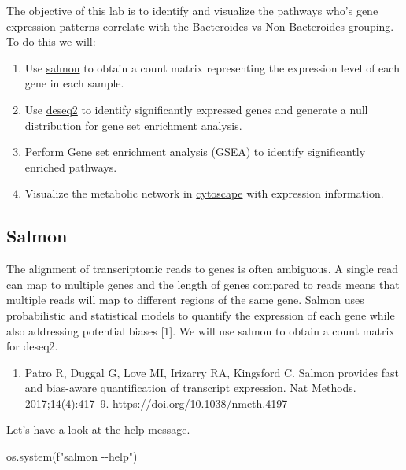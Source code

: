 \documentclass[
]{book}
\newenvironment{Shaded}{\begin{snugshade}}{\end{snugshade}}
\newcommand{\NormalTok}[1]{#1}
\newcommand{\SpecialStringTok}[1]{\textcolor[rgb]{0.31,0.60,0.02}{#1}}
\providecommand{\tightlist}{%
  \setlength{\itemsep}{0pt}\setlength{\parskip}{0pt}}
\begin{document}
The objective of this lab is to identify and visualize the pathways who's gene expression patterns correlate with the Bacteroides vs Non-Bacteroides grouping.
To do this we will:

\begin{enumerate}
\def\labelenumi{\arabic{enumi}.}
\tightlist
\item
  Use \hyperref[salmon]{salmon} to obtain a count matrix representing the expression level of each gene in each sample.
\item
  Use \hyperref[deseq2]{deseq2} to identify significantly expressed genes and generate a null distribution for gene set enrichment analysis.
\item
  Perform \hyperref[gene-set-enrichment-analysis-gsea]{Gene set enrichment analysis (GSEA)} to identify significantly enriched pathways.
\item
  Visualize the metabolic network in \hyperref[cytoscape]{cytoscape} with expression information.
\end{enumerate}

\subsection{Salmon}\label{salmon}

The alignment of transcriptomic reads to genes is often ambiguous. A single read can map to multiple genes and the length of genes compared to reads
means that multiple reads will map to different regions of the same gene. Salmon uses probabilistic and statistical models to quantify the expression of
each gene while also addressing potential biases {[}1{]}. We will use salmon to obtain a count matrix for deseq2.

\begin{enumerate}
\def\labelenumi{\arabic{enumi}.}
\tightlist
\item
  Patro R, Duggal G, Love MI, Irizarry RA, Kingsford C. Salmon provides fast and bias-aware quantification of transcript expression. Nat Methods. 2017;14(4):417--9. \url{https://doi.org/10.1038/nmeth.4197}
\end{enumerate}

Let's have a look at the help message.

\begin{Shaded}
\begin{Highlighting}[numbers=left,,]
\NormalTok{os.system(}\SpecialStringTok{f"salmon {-}{-}help"}\NormalTok{)}
\end{Highlighting}
\end{Shaded}
\end{document}
